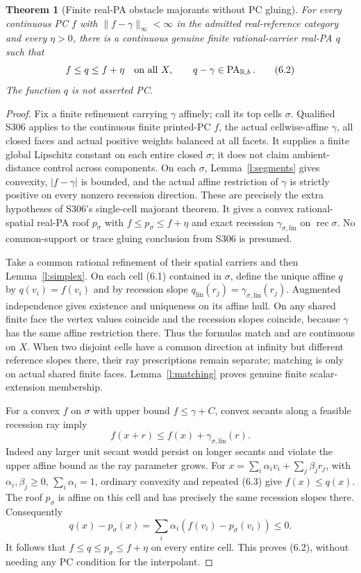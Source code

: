 \documentclass[11pt]{article}
\newtheorem{theorem}{Theorem}[section]
\newcommand{\R}{\mathbb R}\newcommand{\Q}{\mathbb Q}\newcommand{\Z}{\mathbb Z}
\newcommand{\rec}{\operatorname{rec}}\newcommand{\cone}{\operatorname{cone}}
\begin{document}
\begin{theorem}[Finite real-PA obstacle majorants without PC gluing]\label{t:interpolate}
For every continuous PC $f$ with $\|f-\gamma\|_\infty<\infty$ in the admitted real-reference category and every $\eta>0$, there is a continuous genuine finite rational-carrier real-PA $q$ such that
\[
 f\leq q\leq f+\eta\quad\text{on all }X,\qquad q-\gamma\in\PA_{\R,b}.
                                                                    \tag{6.2}
\]
The function $q$ is not asserted PC.
\end{theorem}
\begin{proof}
Fix a finite refinement carrying $\gamma$ affinely; call its top cells $\sigma$. Qualified S306 applies to the continuous finite printed-PC $f$, the actual cellwise-affine $\gamma$, all closed faces and actual positive weights balanced at all facets. It supplies a finite global Lipschitz constant on each entire closed $\sigma$; it does not claim ambient-distance control across components. On each $\sigma$, Lemma~\ref{l:segments} gives convexity, $|f-\gamma|$ is bounded, and the actual affine restriction of $\gamma$ is strictly positive on every nonzero recession direction. These are precisely the extra hypotheses of S306's single-cell majorant theorem. It gives a convex rational-spatial real-PA roof $p_\sigma$ with $f\leq p_\sigma\leq f+\eta$ and exact recession $\gamma_{\sigma,\mathrm{lin}}$ on $\rec\sigma$. No common-support or trace gluing conclusion from S306 is presumed.

Take a common rational refinement of their spatial carriers and then Lemma~\ref{l:simplex}. On each cell (6.1) contained in $\sigma$, define the unique affine $q$ by $q(v_i)=f(v_i)$ and by recession slope $q_{\mathrm{lin}}(r_j)=\gamma_{\sigma,\mathrm{lin}}(r_j)$. Augmented independence gives existence and uniqueness on its affine hull. On any shared finite face the vertex values coincide and the recession slopes coincide, because $\gamma$ has the same affine restriction there. Thus the formulas match and are continuous on $X$. When two disjoint cells have a common direction at infinity but different reference slopes there, their ray prescriptions remain separate; matching is only on actual shared finite faces. Lemma~\ref{l:matching} proves genuine finite scalar-extension membership.

For a convex $f$ on $\sigma$ with upper bound $f\leq\gamma+C$, convex secants along a feasible recession ray imply
\[
 f(x+r)\leq f(x)+\gamma_{\sigma,\mathrm{lin}}(r).
                                                                    \tag{6.3}
\]
Indeed any larger unit secant would persist on longer secants and violate the upper affine bound as the ray parameter grows. For $x=\sum_i\alpha_i v_i+\sum_j\beta_j r_j$, with $\alpha_i,\beta_j\geq0$, $\sum_i\alpha_i=1$, ordinary convexity and repeated (6.3) give $f(x)\leq q(x)$. The roof $p_\sigma$ is affine on this cell and has precisely the same recession slopes there. Consequently
\[
 q(x)-p_\sigma(x)=\sum_i\alpha_i(f(v_i)-p_\sigma(v_i))\leq0.
\]
It follows that $f\leq q\leq p_\sigma\leq f+\eta$ on every entire cell. This proves (6.2), without needing any PC condition for the interpolant.
\end{proof}
\end{document}
